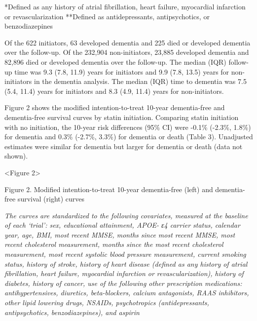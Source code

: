 \documentclass[
]{book}
\begin{document}
*Defined as any history of atrial fibrillation, heart failure, myocardial infarction or revascularization
**Defined as antidepressants, antipsychotics, or benzodiazepines

Of the 622 initiators, 63 developed dementia and 225 died or developed dementia over the follow-up. Of the 232,904 non-initiators, 23,885 developed dementia and 82,896 died or developed dementia over the follow-up. The median (IQR) follow-up time was 9.3 (7.8, 11.9) years for initiators and 9.9 (7.8, 13.5) years for non-initiators in the dementia analysis. The median (IQR) time to dementia was 7.5 (5.4, 11.4) years for initiators and 8.3 (4.9, 11.4) years for non-initiators.

Figure 2 shows the modified intention-to-treat 10-year dementia-free and dementia-free survival curves by statin initiation. Comparing statin initiation with no initiation, the 10-year risk differences (95\% CI) were -0.1\% (-2.3\%, 1.8\%) for dementia and 0.3\% (-2.7\%, 3.3\%) for dementia or death (Table 3). Unadjusted estimates were similar for dementia but larger for dementia or death (data not shown).

\textless Figure 2\textgreater{}

Figure 2. Modified intention-to-treat 10-year dementia-free (left) and dementia-free survival (right) curves

\emph{The curves are standardized to the following covariates, measured at the baseline of each `trial': sex, educational attainment, APOE- ε4 carrier status, calendar year, age, BMI, most recent MMSE, months since most recent MMSE, most recent cholesterol measurement, months since the most recent cholesterol measurement, most recent systolic blood pressure measurement, current smoking status, history of stroke, history of heart disease (defined as any history of atrial fibrillation, heart failure, myocardial infarction or revascularization), history of diabetes, history of cancer, use of the following other prescription medications: antihypertensives, diuretics, beta-blockers, calcium antagonists, RAAS inhibitors, other lipid lowering drugs, NSAIDs, psychotropics (antidepressants, antipsychotics, benzodiazepines), and aspirin}
\end{document}
